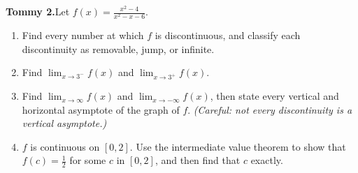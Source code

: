 \documentclass[11pt]{article}
\newcommand{\wsM}{\vspace*{4.5cm}}  %
\newcommand{\wsL}{\vspace*{6.5cm}}  %
\begin{document}
\bigskip
\noindent\textbf{Tommy 2.}\quad Let
$\displaystyle f(x)=\frac{x^{2}-4}{x^{2}-x-6}$.
\begin{enumerate}[label=\textbf{(\alph*)},leftmargin=2.8em,itemsep=6pt,topsep=5pt]
  \item Find every number at which $f$ is discontinuous, and classify each discontinuity
        as removable, jump, or infinite. \wsM
  \item Find $\displaystyle\lim_{x\to3^{-}}f(x)$ and $\displaystyle\lim_{x\to3^{+}}f(x)$. \wsM
  \item Find $\displaystyle\lim_{x\to\infty}f(x)$ and $\displaystyle\lim_{x\to-\infty}f(x)$,
        then state every vertical and horizontal asymptote of the graph of $f$.
        \textit{(Careful: not every discontinuity is a vertical asymptote.)} \wsM
  \item $f$ is continuous on $[0,2]$. Use the intermediate value theorem to show that
        $f(c)=\tfrac{1}{2}$ for some $c$ in $[0,2]$, and then find that $c$ exactly. \wsL
\end{enumerate}
\end{document}
